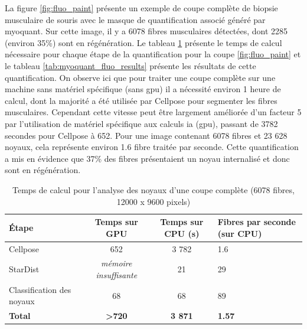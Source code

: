 La figure \ref{fig:fluo_paint} présente un exemple de coupe complète de biopsie musculaire de souris avec le masque de quantification associé généré par \gls{myoquant}. Sur cette image, il y a 6078 fibres musculaires détectées, dont 2285 (environ 35\%) sont en régénération. Le tableau \ref{tab:myoquant_fluo_time} présente le temps de calcul nécessaire pour chaque étape de la quantification pour la coupe \ref{fig:fluo_paint} et le tableau \ref{tab:myoquant_fluo_results} présente les résultats de cette quantification. On observe ici que pour traiter une coupe complète sur une machine sans matériel spécifique (sans \gls{gpu}) il a nécessité environ 1 heure de calcul, dont la majorité a été utilisée par Cellpose pour segmenter les fibres musculaires. Cependant cette vitesse peut être largement améliorée d'un facteur 5 par l'utilisation de matériel spécifique aux calculs \gls{ia} (\gls{gpu}), passant de 3782 secondes pour Cellpose à 652. Pour une image contenant 6078 fibres et 23 628 noyaux, cela représente environ 1.6 fibre traitée par seconde. Cette quantification a mis en évidence que 37\% des fibres présentaient un noyau internalisé et donc sont en régénération.
\begin{table}[htbp]
\centering
\caption{Temps de calcul pour l'analyse des noyaux d'une coupe complète (6078 fibres, 12000 x 9600 pixels)}
\label{tab:myoquant_fluo_time}
\begin{tabularx}{\textwidth}{|l|c|c|X|}
\hline
\textbf{Étape} & \textbf{Temps sur GPU} & \textbf{Temps sur CPU (s)} & \textbf{Fibres par seconde (sur CPU)} \\
\hline
Cellpose & 652 & 3 782 & 1.6 \\
\hline
StarDist & \textit{mémoire insuffisante} & 21 & 29 \\
\hline
Classification des noyaux & 68 & 68 & 89 \\
\hline
\textbf{Total} & \textbf{>720} & \textbf{3 871} & \textbf{1.57} \\
\hline
\end{tabularx}
\end{table}

